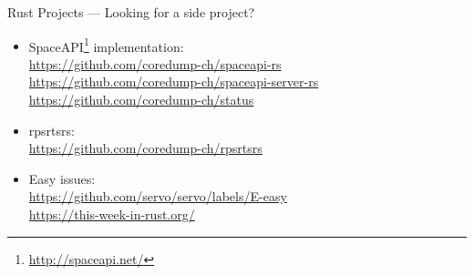 \begin{frame}{Rust Projects --- Looking for a side project?}
\begin{itemize}
    \item SpaceAPI\footnote{\url{http://spaceapi.net/}} implementation:\\
      \url{https://github.com/coredump-ch/spaceapi-rs}\\
      \url{https://github.com/coredump-ch/spaceapi-server-rs}\\
      \url{https://github.com/coredump-ch/status}
    \item rpsrtsrs:\\
      \url{https://github.com/coredump-ch/rpsrtsrs}
    \pause\item Easy issues:\\
      \url{https://github.com/servo/servo/labels/E-easy}\\
      \url{https://this-week-in-rust.org/}
\end{itemize}
\end{frame}
